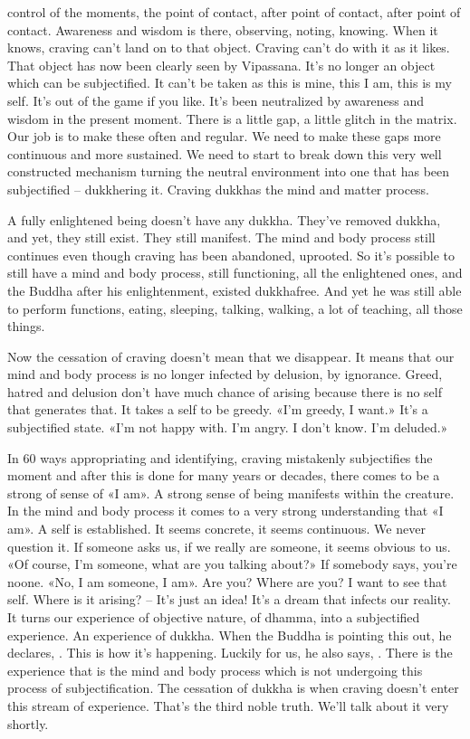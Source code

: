 \documentclass[letterpaper,10pt,english]{sphinxmanual}
\begin{document}
control  of  the  moments,  the  point  of  contact,  after  point  of  contact,  after
point of contact. Awareness and wisdom is there, observing, noting, knowing. When it knows, craving can’t land on to that object. Craving can’t do
with it as it likes. That object has now been clearly seen by Vipassana. It’s no
longer an object which can be subjectified. It can’t be taken as this is mine,
this I am, this is my self. It’s out of the game if you like. It’s been neutralized
  by awareness and wisdom in the present moment. There is a little gap, a little
glitch in the matrix. Our job is to make these often and regular. We need to
make these gaps more continuous and more sustained. We need to start to
break down this very well constructed mechanism turning the neutral environment into one that has been subjectified – dukkhering it. Craving dukkhas
the mind and matter process.

\sphinxAtStartPar
A fully enlightened being doesn’t have any dukkha. They’ve removed
dukkha, and yet, they still exist. They still manifest. The mind and body process still continues even though craving has been abandoned, uprooted. So
it’s possible to still have a mind and body process, still functioning, all the
enlightened ones, and the Buddha after his enlightenment, existed dukkhafree. And yet he was still able to perform functions, eating, sleeping, talking,
walking, a lot of teaching, all those things.

\sphinxAtStartPar
Now the cessation of craving doesn’t mean that we disappear. It means
that our mind and body process is no longer infected by delusion, by ignorance. Greed, hatred and delusion don’t have much chance of arising because
there is no self that generates that. It takes a self to be greedy. «I’m greedy, I
want.» It’s a subjectified state. «I’m not happy with. I’m angry. I don’t know.
I’m deluded.»

\sphinxAtStartPar
In 60 ways appropriating and identifying, craving mistakenly subjectifies  the  moment  and  after  this  is  done  for  many  years  or  decades,  there
comes to be a strong of sense of «I am». A strong sense of being manifests
within the creature. In the mind and body process it comes to a very strong
understanding that «I am». A self is established. It seems concrete, it seems
continuous. We never question it. If someone asks us, if we really are someone, it seems obvious to us. «Of course, I’m someone, what are you talking
about?» If somebody says, you’re no\sphinxhyphen{}one. «No, I am someone, I am». Are
you? Where are you? I want to see that self. Where is it arising? – It’s just an
idea! It’s a dream that infects our reality. It turns our experience of objective
nature, of dhamma, into a subjectified experience. An experience of dukkha.
When the Buddha is pointing this out, he declares,
. This is
how it’s happening. Luckily for us, he also says,
.
There is the experience that is the mind and body process which is not undergoing this process of subjectification. The cessation of dukkha is when craving   doesn’t enter this stream of experience. That’s the third noble truth. We’ll
talk about it very shortly.
\end{document}
